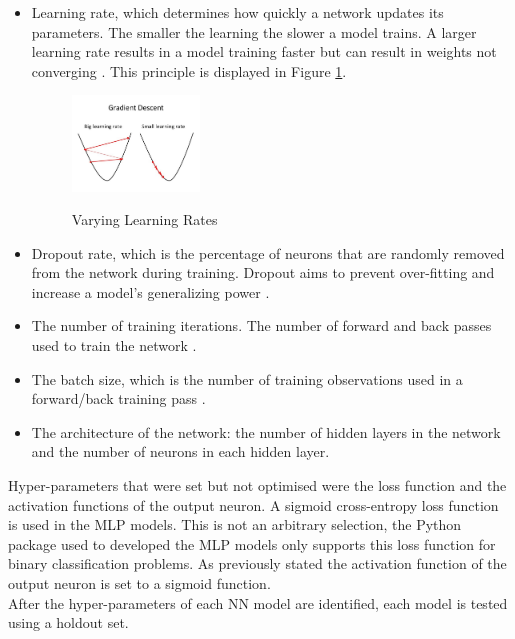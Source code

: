 \begin{itemize}
    \item Learning rate, which determines how quickly a network updates its parameters. The smaller the learning the slower a model trains. A larger learning rate results in a model training faster but can result in weights not converging \parencite{NN_HP}. This principle is displayed in Figure \ref{fig:learning_rates}. 
    
    \vspace{10 pt}

    \begin{figure}[!htb]
    \centering
    \includegraphics[width=0.32\textwidth]{images/learning_rate.jpg}
    \caption{Varying Learning Rates}
    \label{fig:learning_rates}
    \parencite{learning_rate}
    \end{figure}
    
    \vspace{10 pt}
    
    \item Dropout rate, which is the percentage of neurons that are randomly removed from the network during training. Dropout aims to prevent over-fitting and increase a model's generalizing power \parencite{learning_rate}. 
    
    \item The number of training iterations. The number of forward and back passes used to train the network \parencite{NN_HP}.
    
    \item The batch size, which is the number of training observations used in a forward/back training pass \parencite{NN_HP}. 
    
    \item The architecture of the network: the number of hidden layers in the network and the number of neurons in each hidden layer. 

\end{itemize}

 
\vspace{10 pt}

Hyper-parameters that were set but not optimised were the loss function and the activation functions of the output neuron. A sigmoid cross-entropy loss function is used in the MLP models. This is not an arbitrary selection, the Python package used to developed the MLP models only supports this loss function for binary classification problems. As previously stated the activation function of the output neuron is set to a sigmoid function. \\

After the hyper-parameters of each NN model are identified, each model is tested using a holdout set.
